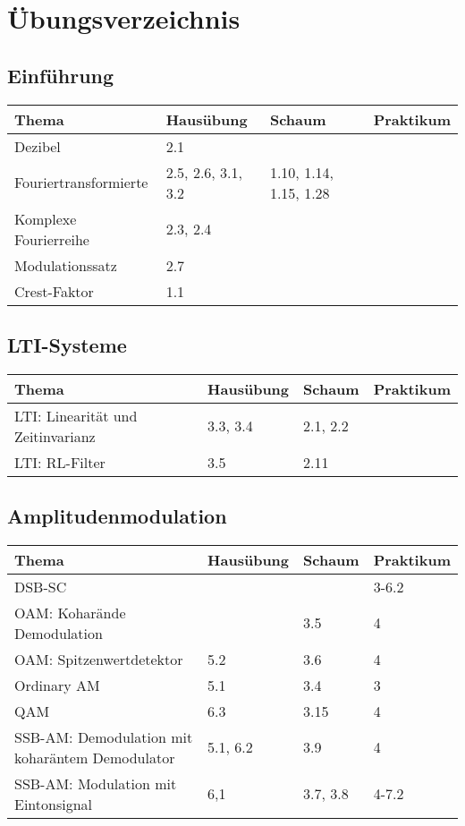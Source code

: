 \section{Übungsverzeichnis}

\subsection{Einführung}
	\begin{tabular}{|p{9cm}|p{2.5cm}|p{3.5cm}|p{2cm}|}
	\hline
	\textbf{Thema} & \textbf{Hausübung} & \textbf{Schaum} & \textbf{Praktikum} \\ \hline
	Dezibel & 2.1 &  &  \\ \hline
	Fouriertransformierte & 2.5, 2.6, 3.1, 3.2  & 1.10, 1.14, 1.15, 1.28 &  \\
	\hline Komplexe Fourierreihe & 2.3, 2.4 & & \\ \hline
	Modulationssatz & 2.7 & & \\ \hline
	Crest-Faktor & 1.1 & & \\ \hline
	\end{tabular}

\subsection{LTI-Systeme}
	\begin{tabular}{|p{9cm}|p{2.5cm}|p{3.5cm}|p{2cm}|}
	\hline
	\textbf{Thema} & \textbf{Hausübung} & \textbf{Schaum} & \textbf{Praktikum} \\ \hline
	LTI: Linearität und Zeitinvarianz & 3.3, 3.4 & 2.1, 2.2 &  \\ \hline
	LTI: RL-Filter & 3.5 & 2.11 &  \\ \hline
	\end{tabular}

\subsection{Amplitudenmodulation}
	\begin{tabular}{|p{9cm}|p{2.5cm}|p{3.5cm}|p{2cm}|}
	\hline
	\textbf{Thema} & \textbf{Hausübung} & \textbf{Schaum} & \textbf{Praktikum} \\ \hline
	DSB-SC &  &  & 3-6.2 \\ \hline
	OAM: Koharände Demodulation & & 3.5 & 4 \\ \hline
	OAM: Spitzenwertdetektor & 5.2 & 3.6 & 4 \\ \hline
	Ordinary AM & 5.1 & 3.4 & 3 \\ \hline
	QAM & 6.3  & 3.15 & 4 \\ \hline
	SSB-AM: Demodulation mit koharäntem Demodulator & 5.1, 6.2 & 3.9 & 4 \\
	\hline SSB-AM: Modulation mit Eintonsignal & 6,1 & 3.7, 3.8 & 4-7.2 \\ \hline
	\end{tabular}

